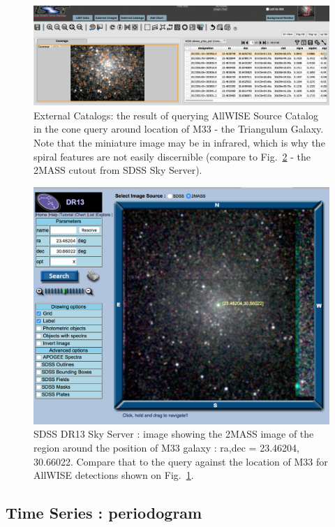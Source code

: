 \documentclass[DM,lsstdraft,toc]{lsstdoc}
\begin{document}
\begin{figure}
\includegraphics[width=\textwidth]{figs/external_catalogs_m33.png}
\caption{External Catalogs:  the result of querying AllWISE Source Catalog in the cone query around location of M33 - the Triangulum Galaxy.  Note that the miniature image may be in infrared, which is why the spiral features are not easily discernible (compare to Fig.~\ref{fig:skyserver_m33}  - the 2MASS cutout from SDSS Sky Server).  }
\label{fig:ext_catalogs_m33}
\end{figure}

\begin{figure}
\includegraphics[width=\textwidth]{figs/external_catalogs_m33_SkyServer.png}
\caption{SDSS DR13  Sky Server : image showing the 2MASS image of the region around the position of M33 galaxy : ra,dec = 23.46204, 30.66022.  Compare that to the query against the location of M33 for AllWISE detections shown on Fig.~\ref{fig:ext_catalogs_m33}. }
\label{fig:skyserver_m33}
\end{figure}


\subsection{Time Series : periodogram}
\label{sec:periodogram}
\end{document}
